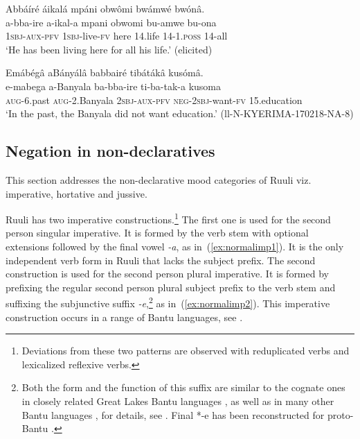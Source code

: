 \documentclass[output=paper,colorlinks,citecolor=brown,draftmode]{langscibook}
\begin{document}
\ea  \label{ex:complexTA}
	\ea \label{ex:complexTA-pos}
	\glll  Abbáíré áikalá mpáni obwômi bwámwé bwónâ.\\
	    a-bba-ire a-ikal-a mpani obwomi bu-amwe bu-ona\\
		\textsc{1sbj}-\textsc{aux}-\textsc{pfv} \textsc{1sbj}-live-\textsc{fv} here 14.life 14-1.\textsc{poss} 14-all\\
\glt ‘He has been living here for all his life.'  (elicited)

\ex \label{ex:complexTA-neg}
	\glll Emábégâ aBányálâ babbairé tibátákâ kusómâ.\\
	    e-mabega a-Banyala ba-bba-ire ti-ba-tak-a kusoma\\
		\textsc{aug}-6.past \textsc{aug}-2.Banyala 2\textsc{sbj}-\textsc{aux}-\textsc{pfv} \textsc{neg}-2\textsc{sbj}-want-\textsc{fv} 15.education\\
\glt  `In the past, the Banyala did not want education.’ 	(ll-N-KYERIMA-170218-NA-8)
\z
\z

\subsection{Negation in non-declaratives}\label{sec:non-declarativesruuli}\label{sec:ruulietal:2.2}

This section addresses the non-declarative mood categories of Ruuli viz.\,impera\-tive, hortative and jussive.

Ruuli has two imperative constructions.\footnote{Deviations from these two patterns are observed with reduplicated verbs and lexicalized reflexive verbs.} 
The first one is used for the second person singular imperative. 
It is formed by the verb stem with optional extensions followed by the final vowel \textit{-a}, as in~(\ref{ex:normalimp1}). 
It is the only independent verb form in Ruuli that lacks the subject prefix. 
The second construction is used for the second person plural imperative. 
It is formed by prefixing the regular second person plural subject prefix to the verb stem and suffixing the subjunctive suffix \textit{-e},\footnote{Both the form and the function of this suffix are similar to the cognate ones in closely related Great Lakes Bantu languages \citep{NurseMuzale1999}, as well as in many other Bantu languages \citep[44, 192]{Nurse2008}, for details, see \citet{VeselovskyEtAl2023}. 
Final *-e has been reconstructed for proto-Bantu \citep{Meeussen1967}.}
as in~(\ref{ex:normalimp2}). 
This imperative construction occurs in a range of Bantu languages, see \citet{DevosVanOlmen2013}.
\end{document}
